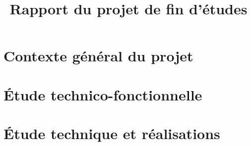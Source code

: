 \documentclass[a4paper, french, 12pt]{report}
\title{Rapport du projet de fin d'études}\let\title\@title
\begin{document}
\begin{titlepage}
  
\end{titlepage}


\ClearShipoutPicture
\newpage









\tableofcontents
\listoftables
\listoffigures



\fancyhead{}
\fancyfoot{}
\fancyfoot[LE,RO]{\thepage}


\part{Contexte général du projet}

\part{Étude technico-fonctionnelle}

\part{Étude technique et réalisations}

\end{document}

